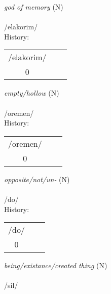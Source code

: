 \vspace{20pt}\hline



\vspace{30pt}
 \textit{god of memory} (N)\\
\\
\noindent /elak{\textprimstress}orim/\\


\noindent History:
\begin{tabular}{ccc}
/elakorim/\\
0\\
\end{tabular}

\vspace{20pt}\hline



\vspace{30pt}
 \textit{empty/hollow} (N)\\
\\
\noindent /or{\textprimstress}emen/\\


\noindent History:
\begin{tabular}{ccc}
/oremen/\\
0\\
\end{tabular}

\vspace{20pt}\hline



\vspace{30pt}
 \textit{opposite/not/un-} (N)\\
\\
\noindent /d{\textprimstress}o/\\


\noindent History:
\begin{tabular}{ccc}
/do/\\
0\\
\end{tabular}

\vspace{20pt}\hline



\vspace{30pt}
 \textit{being/existance/created thing} (N)\\
\\
\noindent /s{\textprimstress}il/\\


